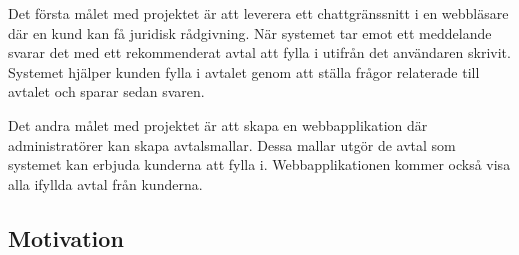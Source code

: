 \documentclass[a4paper,12pt]{article}
\begin{document}
Det första målet med projektet är att leverera ett chattgränssnitt i en webbläsare där en kund kan få juridisk rådgivning. När systemet tar emot ett meddelande svarar det med ett rekommenderat avtal att fylla i utifrån det användaren skrivit. Systemet hjälper kunden fylla i avtalet genom att ställa frågor relaterade till avtalet och sparar sedan svaren.

Det andra målet med projektet är att skapa en webbapplikation där administratörer kan skapa avtalsmallar. Dessa mallar utgör de avtal som systemet kan erbjuda kunderna att fylla i. Webbapplikationen kommer också visa alla ifyllda avtal från kunderna.




\subsection{Motivation}  %

\end{document}
